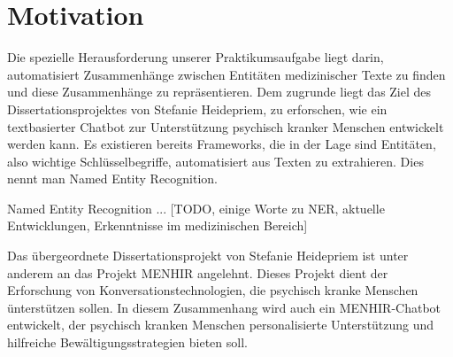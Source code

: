 \chapter{Motivation}

Die spezielle Herausforderung unserer Praktikumsaufgabe liegt darin, automatisiert Zusammenhänge zwischen Entitäten 
medizinischer Texte zu finden und diese Zusammenhänge zu repräsentieren.
Dem zugrunde liegt das Ziel des Dissertationsprojektes von Stefanie Heidepriem, zu erforschen, wie ein textbasierter 
Chatbot zur Unterstützung psychisch kranker Menschen entwickelt werden kann.
Es existieren bereits Frameworks, die in der Lage sind Entitäten, also wichtige Schlüsselbegriffe, automatisiert aus
Texten zu extrahieren. Dies nennt man Named Entity Recognition.

Named Entity Recognition ... [TODO, einige Worte zu NER, aktuelle Entwicklungen, Erkenntnisse im medizinischen Bereich]

Das übergeordnete Dissertationsprojekt von Stefanie Heidepriem ist unter anderem an das Projekt MENHIR angelehnt. Dieses
Projekt dient der Erforschung von Konversationstechnologien, die psychisch kranke Menschen ünterstützen sollen. In diesem
Zusammenhang wird auch ein MENHIR-Chatbot entwickelt, der psychisch kranken Menschen personalisierte Unterstützung und 
hilfreiche Bewältigungsstrategien bieten soll.

